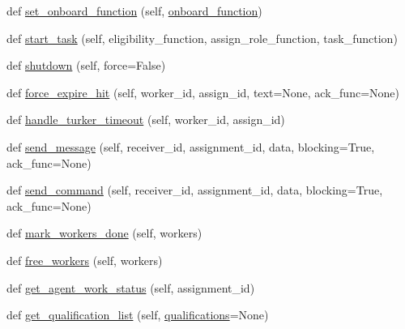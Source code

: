 \begin{DoxyCompactItemize}
\item 
def \hyperlink{classparlai_1_1mturk_1_1core_1_1mturk__manager_1_1MTurkManager_a450a6985e5d7f33a9e7d2a3f92503eca}{set\+\_\+onboard\+\_\+function} (self, \hyperlink{classparlai_1_1mturk_1_1core_1_1mturk__manager_1_1MTurkManager_a4166f7b21495f2451d0fd90a716903f8}{onboard\+\_\+function})
\item 
def \hyperlink{classparlai_1_1mturk_1_1core_1_1mturk__manager_1_1MTurkManager_a30fec0658e0f98228c10ef0667519f97}{start\+\_\+task} (self, eligibility\+\_\+function, assign\+\_\+role\+\_\+function, task\+\_\+function)
\item 
def \hyperlink{classparlai_1_1mturk_1_1core_1_1mturk__manager_1_1MTurkManager_afe84a023a6c77a9af64409bb460dd522}{shutdown} (self, force=False)
\item 
def \hyperlink{classparlai_1_1mturk_1_1core_1_1mturk__manager_1_1MTurkManager_aed4375d01be65944318d695adbac88af}{force\+\_\+expire\+\_\+hit} (self, worker\+\_\+id, assign\+\_\+id, text=None, ack\+\_\+func=None)
\item 
def \hyperlink{classparlai_1_1mturk_1_1core_1_1mturk__manager_1_1MTurkManager_ab93fd934d00fbf971ca299e77db152d5}{handle\+\_\+turker\+\_\+timeout} (self, worker\+\_\+id, assign\+\_\+id)
\item 
def \hyperlink{classparlai_1_1mturk_1_1core_1_1mturk__manager_1_1MTurkManager_a461d68a9cb665b1745442da16ba1584e}{send\+\_\+message} (self, receiver\+\_\+id, assignment\+\_\+id, data, blocking=True, ack\+\_\+func=None)
\item 
def \hyperlink{classparlai_1_1mturk_1_1core_1_1mturk__manager_1_1MTurkManager_aee5b70ddae99ec326b6c512c29f740a3}{send\+\_\+command} (self, receiver\+\_\+id, assignment\+\_\+id, data, blocking=True, ack\+\_\+func=None)
\item 
def \hyperlink{classparlai_1_1mturk_1_1core_1_1mturk__manager_1_1MTurkManager_aeddd0db97149313d3a5fcf04e78c42f5}{mark\+\_\+workers\+\_\+done} (self, workers)
\item 
def \hyperlink{classparlai_1_1mturk_1_1core_1_1mturk__manager_1_1MTurkManager_a711cbcf874261a23adb8d7b2a630634c}{free\+\_\+workers} (self, workers)
\item 
def \hyperlink{classparlai_1_1mturk_1_1core_1_1mturk__manager_1_1MTurkManager_a4e33195c70fe3471fe51c18c2c235121}{get\+\_\+agent\+\_\+work\+\_\+status} (self, assignment\+\_\+id)
\item 
def \hyperlink{classparlai_1_1mturk_1_1core_1_1mturk__manager_1_1MTurkManager_a3466e2c936edfc55727d1bd3ac71cfb6}{get\+\_\+qualification\+\_\+list} (self, \hyperlink{classparlai_1_1mturk_1_1core_1_1mturk__manager_1_1MTurkManager_a7081daf8eaf838de1f220dd0074abe42}{qualifications}=None)

\end{DoxyCompactItemize}
